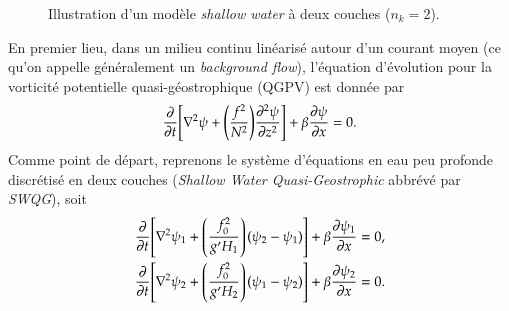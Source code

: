 \documentclass[10pt]{article}
\numberwithin{equation}{section}
\newcommand{\pt}{\hspace{1pt}} %
\begin{document}
\begin{figure}
\begin{center}
\vspace{-\baselineskip}
\end{center}
\caption{\label{org88f22f7}Illustration d'un modèle \textit{shallow water} à deux couches (\(n_k = 2\)).}
\end{figure}

En premier lieu, dans un milieu continu linéarisé autour d'un courant moyen (ce qu'on appelle généralement un \emph{background flow}), l'équation d'évolution pour la vorticité potentielle quasi-géostrophique (QGPV) est donnée par
\begin{equation}
\label{eq:org4a23bbe}
   \pdv{}{t} \qty[\laplacian\psi + \qty(\frac{f^2}{N^2})\pdv[2]{\psi}{z}] + \beta \pdv{\psi}{x} = 0.
\end{equation}
Comme point de départ, reprenons le système d'équations en eau peu profonde discrétisé en deux couches (\emph{Shallow Water Quasi-Geostrophic} abbrévé par \emph{SWQG}), soit
\begin{subequations}
\label{eq:org7eb7a8a}
\begin{align}
   &\pdv{}{t} \qty[\laplacian\psi_1 + \qty(\frac{f_0^2}{g'H_1}) \pt(\psi_2 - \psi_1)] + \beta \pdv{\psi_1}{x} = 0,\\
   &\pdv{}{t} \qty[\laplacian\psi_2 + \qty(\frac{f_0^2}{g'H_2}) \pt(\psi_1 - \psi_2)] + \beta \pdv{\psi_2}{x} = 0.
\end{align}
\end{subequations}
\end{document}
